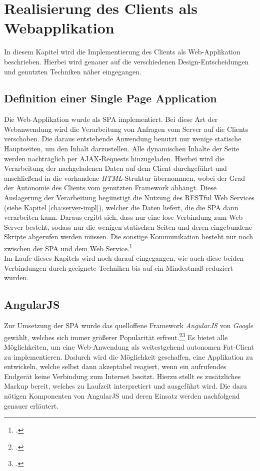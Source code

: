 \chapter{Realisierung des Clients als Webapplikation}
\label{cha:web-app}
In diesem Kapitel wird die Implementierung des Clients als Web-Applikation beschrieben. Hierbei wird genauer auf die verschiedenen Design-Entscheidungen und genutzten Techniken näher eingegangen. 
\section{Definition einer Single Page Application}
\label{sec:Definition-SPA}
Die Web-Applikation wurde als \ac{SPA} implementiert. Bei diese Art der Webanwendung wird die Verarbeitung von Anfragen vom Server auf die Clients verschoben. Die daraus entstehende Anwendung benutzt nur wenige statische Hauptseiten, um den Inhalt darzustellen. Alle dynamischen Inhalte der Seite werden nachträglich per \ac{AJAX}-Requests hinzugeladen.  Hierbei wird die Verarbeitung der nachgeladenen Daten auf dem Client durchgeführt und anschließend in die vorhandene \textit{\ac{HTML}}-Struktur übernommen, wobei der Grad der Autonomie des Clients vom genutzten Framework abhängt. Diese Auslagerung der Verarbeitung begünstigt die Nutzung des \ac{REST}ful Web Services (siehe Kapitel \ref{cha:server-impl}), welcher die Daten liefert, die die \ac{SPA} dann verarbeiten kann. Daraus ergibt sich, dass nur eine lose Verbindung zum Web Server besteht, sodass nur die wenigen statischen Seiten und deren eingebundene Skripte abgerufen werden müssen. Die sonstige Kommunikation besteht nur noch zwischen der \ac{SPA} und dem Web Service.\footcite[S. 31f.]{book:AngularJs:Steyer2015} \\
Im Laufe dieses Kapitels wird noch darauf eingegangen, wie auch diese beiden Verbindungen durch geeignete Techniken bis auf ein Mindestmaß reduziert wurden.
\section{AngularJS}
\label{sec:AngularJS}
Zur Umsetzung der \ac{SPA} wurde das quelloffene Framework \textit{AngularJS} von \textit{Google} gewählt, welches sich immer größerer Popularität erfreut.\footcite{online:angularjs-popularity}\footcite[S. 33]{book:AngularJs:Steyer2015} Es bietet alle Möglichkeiten, um eine Web-Anwendung als weitestgehend autonomen \gls{Fat-Client} zu implementieren. Dadurch wird die Möglichkeit geschaffen, eine Applikation zu entwickeln, welche selbst dann akzeptabel reagiert, wenn ein aufrufendes Endgerät keine Verbindung zum Internet besitzt. Hierzu stellt es zusätzliches \gls{Markup} bereit, welches zu Laufzeit interpretiert und ausgeführt wird. Die dazu nötigen Komponenten von AngularJS und deren Einsatz werden nachfolgend genauer erläutert.

